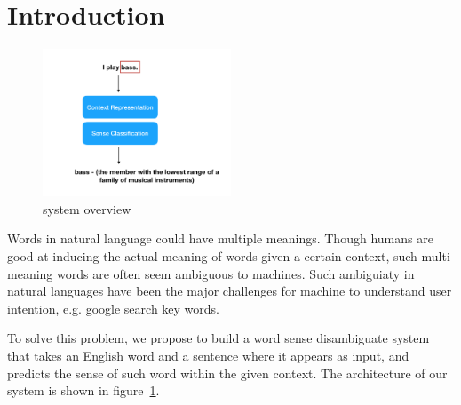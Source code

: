\section{Introduction}

\begin{figure}[H]
  \centering
\includegraphics[width=0.5\textwidth]{graphs/overview.png}
\caption{system overview}
  \label{fig:overview}
\end{figure}

Words in natural language could have multiple meanings. Though humans are good
at inducing the actual meaning of words given a certain context, such
multi-meaning words are often seem ambiguous to machines. Such ambiguiaty in
natural languages have been the major challenges for machine to understand user
intention, e.g. google search key words.

To solve this problem, we propose to build a word sense disambiguate system that
takes an English word and a sentence where it appears as input, and predicts the
sense of such word within the given context. The architecture of our system is
shown in figure~\ref{fig:overview}.
